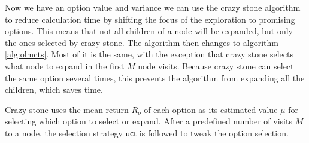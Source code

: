 Now we have an option value and variance we can use the crazy stone algorithm
to reduce calculation time by shifting the focus of the exploration to promising
options. This means that not all children of a node will be expanded, but only
the ones selected by crazy stone. The algorithm then changes to algorithm
\ref{alg:olmcts}. Most of it is the same, with the exception that crazy stone
selects what node to expand in the first $M$ node visits. Because crazy stone
can select the same option several times, this prevents the algorithm from
expanding all the children, which saves time. 

Crazy stone uses the mean return $R_o$ of each option as its estimated value
$\mu$ for selecting which option to select or expand. After a predefined number
of visits $M$ to a node, the selection strategy $\mathsf{uct}$ is followed to
tweak the option selection.


